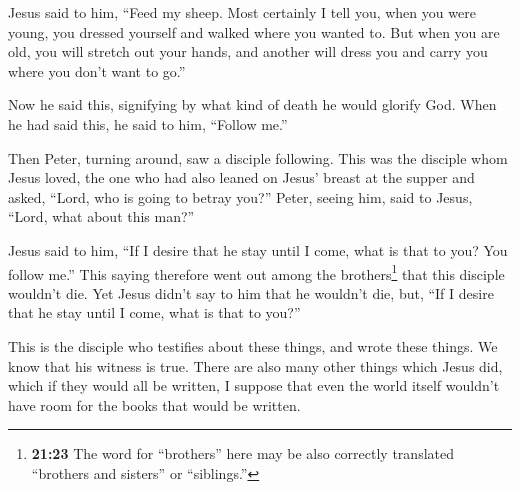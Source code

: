 \begin{paracol}{2}
\begin{otherlanguage}{english}
Jesus said to him, ``Feed my sheep.  Most certainly I
tell you, when you were young, you dressed yourself and walked where you
wanted to. But when you are old, you will stretch out your hands, and
another will dress you and carry you where you don't want to go.''

 Now he said this, signifying by what kind of death he
would glorify God. When he had said this, he said to him, ``Follow me.''

 Then Peter, turning around, saw a disciple following.
This was the disciple whom Jesus loved, the one who had also leaned on
Jesus' breast at the supper and asked, ``Lord, who is going to betray
you?''  Peter, seeing him, said to Jesus, ``Lord, what
about this man?''

 Jesus said to him, ``If I desire that he stay until I
come, what is that to you? You follow me.''  This saying
therefore went out among the brothers\footnote{\textbf{21:23} The word
  for ``brothers'' here may be also correctly translated ``brothers and
  sisters'' or ``siblings.''} that this disciple wouldn't die. Yet Jesus
didn't say to him that he wouldn't die, but, ``If I desire that he stay
until I come, what is that to you?''

 This is the disciple who testifies about these things,
and wrote these things. We know that his witness is true.
 There are also many other things which Jesus did, which
if they would all be written, I suppose that even the world itself
wouldn't have room for the books that would be written.
\end{otherlanguage} \end{paracol}
